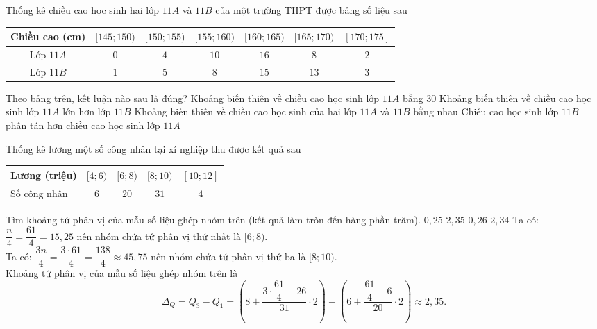 \begin{ex}%
	Thống kê chiều cao học sinh hai lớp $11A$ và $11B$ của một trường THPT được bảng số liệu sau
	\begin{center}
		\begin{tabular}{|c|c|c|c|c|c|c|}
			\hline
			Chiều cao (cm) & {$[145; 150)$} & {$[150; 155)$} & {$[155; 160)$} & {$[160; 165)$} & {$[165; 170)$} & {$[170; 175]$} \\
			\hline
			Lớp $11A$      & $0$            & $4$            & $10$           & $16$           & $8$            & $2$            \\
			\hline
			Lớp $11B$      & $1$            & $5$            & $8$            & $15$           & $13$           & $3$            \\
			\hline
		\end{tabular}
	\end{center}
	Theo bảng trên, kết luận nào sau là đúng?
	\choice
	{Khoảng biến thiên về chiều cao học sinh lớp $11A$ bằng $30$}
	{Khoảng biến thiên về chiều cao học sinh lớp $11A$ lớn hơn lớp $11B$}
	{Khoảng biến thiên về chiều cao học sinh của hai lớp $11A$ và $11B$ bằng nhau}
	{\True Chiều cao học sinh lớp $11B$ phân tán hơn chiều cao học sinh lớp $11A$}
\end{ex}

\begin{ex}%
	Thống kê lương một số công nhân tại xí nghiệp thu được kết quả sau
	\begin{center}
		\begin{tabular}{|l|c|c|c|c|}
			\hline Lương (triệu) & {$[4 ; 6)$} & {$[6 ; 8)$} & {$[8 ; 10)$} & {$[10 ; 12]$} \\
			\hline Số công nhân  & $ 6$        & $20$        & $31$         & $4$           \\
			\hline
		\end{tabular}
	\end{center}
	Tìm khoảng tứ phân vị của mẫu số liệu ghép nhóm trên (kết quả làm tròn đến hàng phần trăm).
	\choice
	{$0{,}25$}
	{\True $2{,}35$}
	{$0{,}26$}
	{$2{,}34$}
	\loigiai
	{
	Ta có: $\dfrac{n}{4}=\dfrac{61}{4}=15{,}25$ nên nhóm chứa tứ phân vị thứ nhất là $[6 ; 8)$.\\
	Ta có: $\dfrac{3 n}{4}=\dfrac{3\cdot61}{4}=\dfrac{138}{4} \approx 45,75$ nên nhóm chứa tứ phân vị thứ ba là $[8 ; 10)$.\\
	Khoảng tứ phân vị của mẫu số liệu ghép nhóm trên là
	\[
		\Delta_Q=Q_3-Q_1=\left(8+\dfrac{3 \cdot \dfrac{61}{4}-26}{31} \cdot 2\right)-\left(6+\dfrac{\dfrac{61}{4}-6}{20} \cdot 2\right) \approx 2,35 .
	\]
	}
\end{ex}

